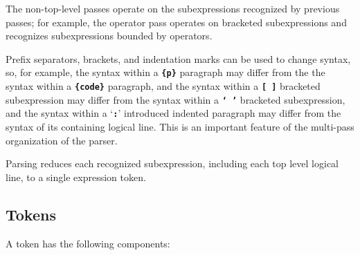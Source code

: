 \documentclass[12pt]{article}
\newcommand{\TT}[1]{{\tt \bfseries #1}}
\begin{document}
The non-top-level passes
operate on the subexpressions recognized by previous passes;
for example, the operator pass operates on bracketed subexpressions
and recognizes
subexpressions bounded by operators.

Prefix separators, brackets, and indentation marks
can be used to change syntax, so, for example,
the syntax within a \TT{\{p\}} paragraph may differ from the
the syntax within a \TT{\{code\}} paragraph, and
the syntax within a \TT{[ ]} bracketed subexpression may differ from
the syntax within a \TT{` '} bracketed subexpression, and
the syntax within a `\TT{:}' introduced indented paragraph may differ
from the syntax of its containing logical line.
This is an important feature of the multi-pass organization of
the parser.

Parsing reduces each recognized subexpression, including each top level
logical line, to a single expression token.

\subsection{Tokens}
\label{TOKENS}

A token has the following components:
\end{document}
